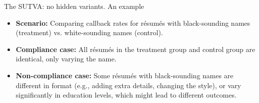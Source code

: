 \documentclass[aspectratio=169]{beamer}
\begin{document}
\begin{frame}{The SUTVA: no hidden variants. An example}

\begin{itemize}
    \item \textbf{Scenario:} Comparing callback rates for résumés with black-sounding names (treatment) vs. white-sounding names (control).
    \item \textbf{Compliance case:} All résumés in the treatment group and control group are identical, only varying the name. 
    
    \item \textbf{Non-compliance case:} Some résumés with black-sounding names are different in format \textcolor{deepskyblue3}{(e.g., adding extra details, changing the style)}, or vary significantly in education levels, which might lead to different outcomes.
\end{itemize}

\end{frame}
\end{document}
